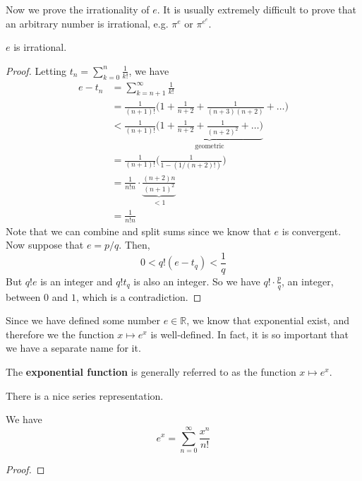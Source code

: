   Now we prove the irrationality of $e$. It is usually extremely difficult to prove that an arbitrary number is irrational, e.g. $\pi^e$ or $\pi^{e^e}$. 

  \begin{theorem}[$e$ is Irrational]
    $e$ is irrational. 
  \end{theorem}
  \begin{proof} 
    Letting $t_n = \sum_{k=0}^n \frac{1}{k!}$, we have 
    \begin{align}
      e - t_n & = \sum_{k=n+1}^\infty \frac{1}{k!} \\
              & = \frac{1}{(n+1)!} \bigg( 1 + \frac{1}{n+2} + \frac{1}{(n+3)(n+2)} + \ldots \bigg) \\
              & < \frac{1}{(n+1)!} \underbrace{\bigg( 1 + \frac{1}{n+2} + \frac{1}{(n+2)^2} + \ldots \bigg)}_{\text{geometric}} \\
              & = \frac{1}{(n+1)!} \bigg( \frac{1}{1 - (1/(n+2)!)}\bigg) \\
              & = \frac{1}{n! n} \cdot \underbrace{\frac{(n+2) n}{(n+1)^2}}_{< 1} \\
              & = \frac{1}{n! n}
    \end{align}
    Note that we can combine and split sums since we know that $e$ is convergent. Now suppose that $e = p/q$. Then, 
    \begin{equation}
      0 < q! (e - t_q) < \frac{1}{q}
    \end{equation}
    But $q! e$ is an integer and $q! t_q$ is also an integer. So we have $q! \cdot \frac{p}{q}$, an integer, between $0$ and $1$, which is a contradiction. 
  \end{proof}

  Since we have defined some number $e \in \mathbb{R}$, we know that exponential exist, and therefore we the function $x \mapsto e^x$ is well-defined. In fact, it is so important that we have a separate name for it. 

  \begin{definition}
    The \textbf{exponential function} is generally referred to as the function $x \mapsto e^x$. 
  \end{definition}

  There is a nice series representation. 

  \begin{theorem}
    We have 
    \begin{equation}
      e^x = \sum_{n=0}^\infty \frac{x^n}{n!}
    \end{equation}
  \end{theorem}
  \begin{proof}
    
  \end{proof}

